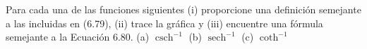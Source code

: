 \item Para cada una de las funciones siguientes (i) proporcione una definición semejante a las incluidas en (6.79), (ii) trace la gráfica y (iii) encuentre una fórmula semejante a la Ecuación 6.80.
    (a) $\operatorname{csch}^{-1}$ \quad (b) $\operatorname{sech}^{-1}$ \quad (c) $\coth^{-1}$
